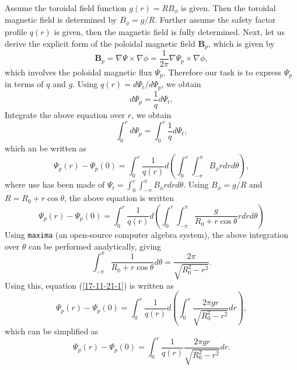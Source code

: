 \documentclass{llncs}
\begin{document}
Assume the toroidal field function $g (r) = R B_{\phi}$ is given. Then the
toroidal magnetic field is determined by $B_{\phi} = g / R$. Further assume
the safety factor profile $q (r)$ is given, then the magnetic field is fully
determined. Next, let us derive the explicit form of the poloidal magnetic
field $\mathbf{B}_p$, which is given by
\begin{equation}
  \label{17-11-21-6} \mathbf{B}_p = \nabla \Psi \times \nabla \phi =
  \frac{1}{2 \pi} \nabla \Psi_p \times \nabla \phi,
\end{equation}
which involves the poloidal magnetic flux $\Psi_p$. Therefore our task is to
express $\Psi_p$ in terms of $q$ and $g$. Using $q (r) = d \Psi_t / d \Psi_p$,
we obtain
\[ d \Psi_p = \frac{1}{q} d \Psi_t, \]
Integrate the above equation over $r$, we obtain
\begin{equation}
  \int_0^r d \Psi_p = \int_0^r \frac{1}{q} d \Psi_t,
\end{equation}
which an be written as
\begin{equation}
  \Psi_p (r) - \Psi_p (0) = \int_0^r \frac{1}{q (r)} d \left( \int_0^r \int_{-
  \pi}^{\pi} B_{\phi} r d r d \theta \right),
\end{equation}
where use has been made of $\Psi_t = \int_0^r \int_{- \pi}^{\pi} B_{\phi} r d
r d \theta$. Using $B_{\phi} = g / R$ and $R = R_0 + r \cos \theta$, the above
equation is written
\begin{equation}
  \label{17-11-21-1} \Psi_p (r) - \Psi_p (0) = \int_0^r \frac{1}{q (r)} d
  \left( \int_0^r \int_{- \pi}^{\pi} \frac{g}{R_0 + r \cos \theta} r d r d
  \theta \right)
\end{equation}
Using {\texttt{maxima}} (an open-source computer algebra system), the above
integration over $\theta$ can be performed analytically, giving
\begin{equation}
  \int_{- \pi}^{\pi} \frac{1}{R_0 + r \cos \theta} d \theta = \frac{2
  \pi}{\sqrt{R_0^2 - r^2}} .
\end{equation}
Using this, equation (\ref{17-11-21-1}) is written as
\begin{equation}
  \Psi_p (r) - \Psi_p (0) = \int_0^r \frac{1}{q (r)} d \left( \int_0^r \frac{2
  \pi g r}{\sqrt{R_0^2 - r^2}} d r \right),
\end{equation}
which can be simplified as
\begin{equation}
  \label{17-11-21-e3} \Psi_p (r) - \Psi_p (0) = \int_0^r \frac{1}{q (r)} 
  \frac{2 \pi g r}{\sqrt{R_0^2 - r^2}} d r.
\end{equation}
\end{document}

